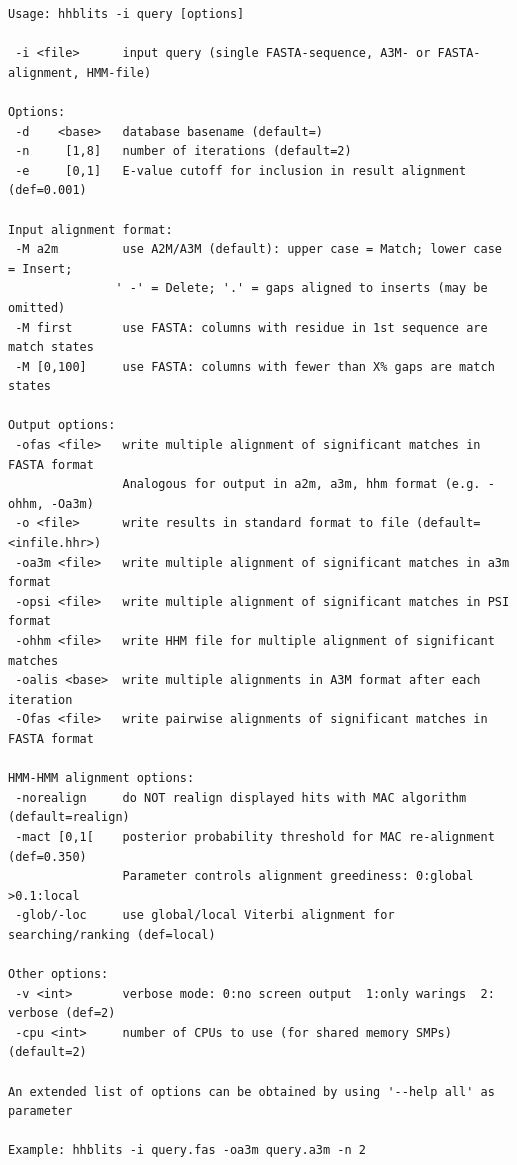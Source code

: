 \documentclass[11pt,a4paper]{article}
\begin{document}
\small 
\begin{verbatim}
Usage: hhblits -i query [options]                                                             

 -i <file>      input query (single FASTA-sequence, A3M- or FASTA-alignment, HMM-file)   

Options:                                                                                 
 -d    <base>   database basename (default=)                                           
 -n     [1,8]   number of iterations (default=2)                                        
 -e     [0,1]   E-value cutoff for inclusion in result alignment (def=0.001)                

Input alignment format:                                                       
 -M a2m         use A2M/A3M (default): upper case = Match; lower case = Insert;
               ' -' = Delete; '.' = gaps aligned to inserts (may be omitted)   
 -M first       use FASTA: columns with residue in 1st sequence are match states
 -M [0,100]     use FASTA: columns with fewer than X% gaps are match states   

Output options:                                                                          
 -ofas <file>   write multiple alignment of significant matches in FASTA format
                Analogous for output in a2m, a3m, hhm format (e.g. -ohhm, -Oa3m)
 -o <file>      write results in standard format to file (default=<infile.hhr>)          
 -oa3m <file>   write multiple alignment of significant matches in a3m format
 -opsi <file>   write multiple alignment of significant matches in PSI format
 -ohhm <file>   write HHM file for multiple alignment of significant matches
 -oalis <base>  write multiple alignments in A3M format after each iteration
 -Ofas <file>   write pairwise alignments of significant matches in FASTA format

HMM-HMM alignment options:                                                               
 -norealign     do NOT realign displayed hits with MAC algorithm (default=realign)       
 -mact [0,1[    posterior probability threshold for MAC re-alignment (def=0.350)          
                Parameter controls alignment greediness: 0:global >0.1:local             
 -glob/-loc     use global/local Viterbi alignment for searching/ranking (def=local)     

Other options:                                                                           
 -v <int>       verbose mode: 0:no screen output  1:only warings  2: verbose (def=2)    
 -cpu <int>     number of CPUs to use (for shared memory SMPs) (default=2)              

An extended list of options can be obtained by using '--help all' as parameter           

Example: hhblits -i query.fas -oa3m query.a3m -n 2                                            
\end{verbatim} 
\normalsize
\end{document}
